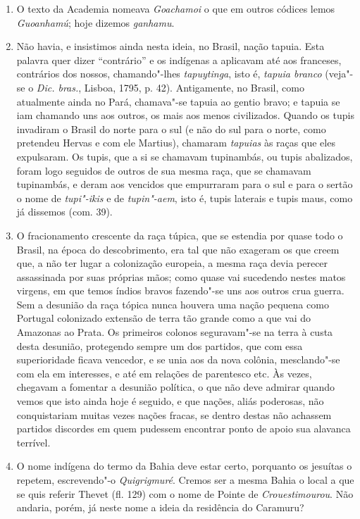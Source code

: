 \begin{enumerate}
\item O texto da Academia nomeava \textit{Goachamoi} o que em outros códices lemos 
\textit{Guoanhamú}; hoje dizemos \textit{ganhamu}.

\item Não havia, e insistimos ainda nesta ideia, no Brasil, nação tapuia. Esta palavra 
quer dizer ``contrário'' e os indígenas a aplicavam até aos franceses, contrários dos 
nossos, chamando"-lhes \textit{tapuytinga}, isto é, \textit{tapuia branco} (veja"-se o \textit{Dic. bras.}, Lisboa, 
1795, p. 42). Antigamente, no Brasil, como atualmente ainda no Pará, chamava"-se 
tapuia ao gentio bravo; e tapuia se iam chamando uns aos outros, os mais aos menos 
civilizados. Quando os tupis invadiram o Brasil do norte para o sul (e não do sul para o 
norte, como pretendeu Hervas e com ele Martius), chamaram \textit{tapuias} às raças que eles 
expulsaram. Os tupis, que a si se chamavam tupinambás, ou tupis abalizados, foram 
logo seguidos de outros de sua mesma raça, que se chamavam tupinambás, e deram aos 
vencidos que empurraram para o sul e para o sertão o nome de \textit{tupi"-ikis} e de \textit{tupin"-aem}, 
isto é, tupis laterais e tupis maus, como já dissemos (com. 39).

\item  O fracionamento crescente da raça túpica, que se estendia por
quase todo o Brasil, na época do descobrimento, era tal que não exageram
os que creem que, a não ter lugar a colonização europeia, a mesma raça devia
perecer assassinada por suas próprias mãos; como quase vai sucedendo nestes
matos virgens, em que temos índios bravos fazendo"-se uns aos outros crua
guerra. Sem a desunião da raça tópica nunca houvera uma nação pequena
como Portugal colonizado extensão de terra tão grande como a que vai do
Amazonas ao Prata. Os primeiros colonos seguravam"-se na terra à custa
desta desunião, protegendo sempre um dos partidos, que com essa superioridade 
ficava vencedor, e se unia aos da nova colônia, mesclando"-se com ela
em interesses, e até em relações de parentesco etc. Às vezes, chegavam a
fomentar a desunião política, o que não deve admirar quando vemos que isto ainda 
hoje é seguido, e que nações, aliás poderosas, não conquistariam muitas vezes nações 
fracas, se dentro destas não achassem partidos discordes em quem pudessem encontrar ponto 
de apoio sua alavanca terrível.

\item O nome indígena do termo da Bahia deve estar certo, porquanto os jesuítas o 
repetem, escrevendo"-o \textit{Quigrigmuré}. Cremos ser a mesma Bahia o local a que se 
quis referir Thevet (fl. 129) com o nome de Pointe de \textit{Crouestimourou}. Não andaria, 
porém, já neste nome a ideia da residência do Caramuru?


\end{enumerate}
